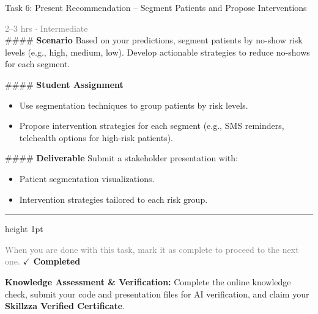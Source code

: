 \documentclass[10pt,a4paper]{article}
\begin{document}
\begin{taskbox}{Task 6: Present Recommendation – Segment Patients and Propose Interventions}

    {\small \textcolor{gray}{2--3 hrs $\cdot$ Intermediate}}\\[12pt]

    \#\#\#\# \textbf{Scenario}  
Based on your predictions, segment patients by no-show risk levels (e.g., high, medium, low). Develop actionable strategies to reduce no-shows for each segment.  

\#\#\#\# \textbf{Student Assignment}  
\begin{itemize}
    \item Use segmentation techniques to group patients by risk levels.  
    \item Propose intervention strategies for each segment (e.g., SMS reminders, telehealth options for high-risk patients).  
\end{itemize}

\#\#\#\# \textbf{Deliverable}  
Submit a stakeholder presentation with:  
\begin{itemize}
    \item Patient segmentation visualizations.  
    \item Intervention strategies tailored to each risk group.\par
\end{itemize}

    \vspace{16pt}

    \textcolor{cardBorder}{\hrule height 1pt}\vspace{8pt}

    \small \textcolor{gray}{When you are done with this task, mark it as complete to proceed to the next one.} \hfill \textbf{\textcolor{brandDark}{$\checkmark$ Completed}}

\end{taskbox}

\begin{completionbox}
    \textbf{Knowledge Assessment \& Verification:} Complete the online knowledge check, submit your code and presentation files for AI verification, and claim your \textbf{Skillzza Verified Certificate}.
\end{completionbox}

\newpage


\end{document}
